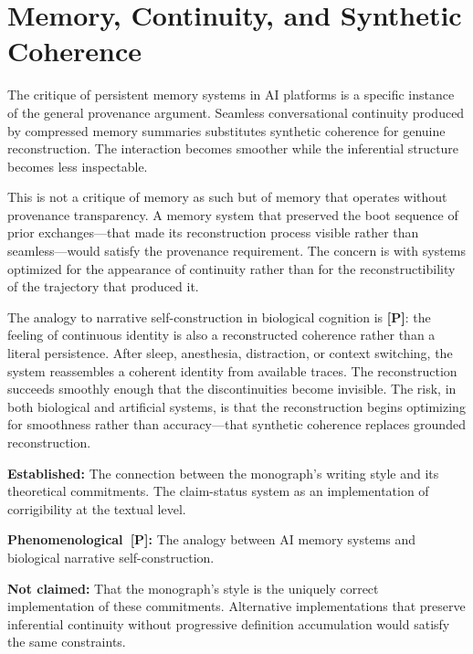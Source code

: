\section{Memory, Continuity, and Synthetic Coherence}

The critique of persistent memory systems in AI platforms is a specific instance
of the general provenance argument. Seamless conversational continuity produced
by compressed memory summaries substitutes synthetic coherence for genuine
reconstruction. The interaction becomes smoother while the inferential structure
becomes less inspectable.

This is not a critique of memory as such but of memory that operates without
provenance transparency. A memory system that preserved the boot sequence of
prior exchanges---that made its reconstruction process visible rather than
seamless---would satisfy the provenance requirement. The concern is with systems
optimized for the appearance of continuity rather than for the reconstructibility
of the trajectory that produced it.

The analogy to narrative self-construction in biological cognition is
\textbf{[P]}: the feeling of continuous identity is also a reconstructed
coherence rather than a literal persistence. After sleep, anesthesia, distraction,
or context switching, the system reassembles a coherent identity from available
traces. The reconstruction succeeds smoothly enough that the discontinuities
become invisible. The risk, in both biological and artificial systems, is that
the reconstruction begins optimizing for smoothness rather than accuracy---that
synthetic coherence replaces grounded reconstruction.

\begin{constraintboundary}
\textbf{Established:} The connection between the monograph's writing style and
its theoretical commitments. The claim-status system as an implementation of
corrigibility at the textual level.

\textbf{Phenomenological~[P]:} The analogy between AI memory systems and
biological narrative self-construction.

\textbf{Not claimed:} That the monograph's style is the uniquely correct
implementation of these commitments. Alternative implementations that preserve
inferential continuity without progressive definition accumulation would satisfy
the same constraints.
\end{constraintboundary}
